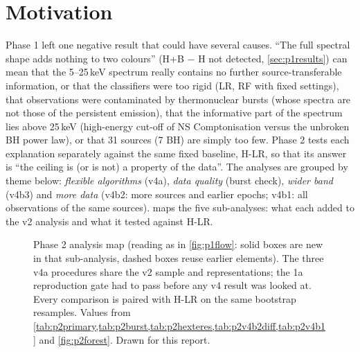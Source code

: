\section{Motivation}
Phase 1 left one negative result that could have several causes. ``The full spectral shape adds nothing to two colours''
(H+B $-$ H not detected, \cref{sec:p1results}) can mean that the 5--25\,keV spectrum really contains no further
source-transferable information, or that the classifiers were too rigid (LR, RF with fixed settings), that observations
were contaminated by thermonuclear bursts (whose spectra are not those of the persistent emission), that the
informative part of the spectrum lies above 25\,keV (high-energy cut-off of NS Comptonisation versus the unbroken BH
power law), or that 31 sources (7 BH) are simply too few. Phase 2 tests each explanation separately against the same
fixed baseline, H-LR, so that its answer is ``the ceiling is (or is not) a property of the data''. The analyses are
grouped by theme below: \emph{flexible algorithms} (v4a), \emph{data quality} (burst check), \emph{wider band} (v4b3)
and \emph{more data} (v4b2: more sources and earlier epochs; v4b1: all observations of the same sources).
 maps the five sub-analyses: what each added to the v2 analysis and what it tested against H-LR.

\begin{figure}[htbp]
\centering

\caption[Phase 2 analysis map]{Phase 2 analysis map (reading as in \cref{fig:p1flow}: solid boxes are new in that sub-analysis,
dashed boxes reuse earlier elements). The three v4a procedures share the v2 sample and representations; the 1a reproduction gate
had to pass before any v4 result was looked at. Every comparison is paired with H-LR on the same bootstrap resamples. Values from
\cref{tab:p2primary,tab:p2burst,tab:p2hexteres,tab:p2v4b2diff,tab:p2v4b1} and \cref{fig:p2forest}. Drawn for this report.}
\label{fig:p2flow}
\end{figure}

